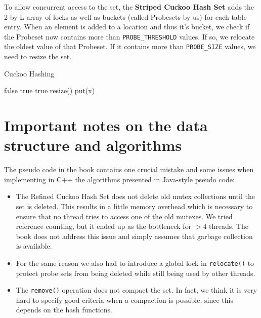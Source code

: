 \documentclass[a4paper,10pt]{article}
\begin{document}
To allow concurrent access to the set, the \textbf{Striped Cuckoo Hash Set}
adds the 2-by-L array of locks as well as buckets (called Probesets by us) for
each table entry. When an element is added to a location and thus it's bucket,
we check if the Probeset now contains more than \lstinline|PROBE_THRESHOLD|
values. If so, we relocate the oldest value of that Probeset. If it contains
more than \lstinline|PROBE_SIZE| values, we need to resize the set.

\begin{algorithm}
\caption{Cuckoo Hashing}
\label{alg:cuckooHashing}
\begin{algorithmic}[5]
		\State \Return false
	\EndIf
			\State \Return true
			\State \Return true
		\EndIf
	\EndFor
	\State resize()
	\State put(x)
\EndFunction
\end{algorithmic}
\end{algorithm}

\section{Important notes on the data structure and algorithms}
\label{sec:implDetails}
The pseudo code in the book contains one crucial mistake and some issues when
implementing in C++ the algorithms presented in Java-style pseudo code:

\begin{itemize}
\item The Refined Cuckoo Hash Set does not delete old mutex collections until
    the set is deleted. This results in a little memory overhead which is
    necessary to ensure that no thread tries to access one of the old mutexes.
    We tried reference counting, but it ended up as the bottleneck for $>4$
    threads. The book does not address this issue and simply assumes that
    garbage collection is available.
\item For the same reason we also had to introduce a global lock in
    \lstinline|relocate()| to protect probe sets from being deleted while still
    being used by other threads.
\item The \lstinline|remove()| operation does not compact the set. In fact, we
    think it is very hard to specify good criteria when a compaction is
    possible, since this depends on the hash functions.

\end{itemize}
\end{document}
